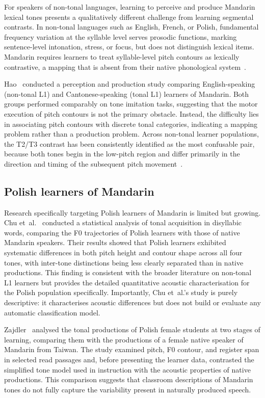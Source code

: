 For speakers of non-tonal languages, learning to perceive and produce Mandarin lexical tones presents a qualitatively different challenge from learning segmental contrasts. In non-tonal languages such as English, French, or Polish, fundamental frequency variation at the syllable level serves prosodic functions, marking sentence-level intonation, stress, or focus, but does not distinguish lexical items. Mandarin requires learners to treat syllable-level pitch contours as lexically contrastive, a mapping that is absent from their native phonological system~\cite{hao2012}.

Hao~\cite{hao2012} conducted a perception and production study comparing English-speaking (non-tonal L1) and Cantonese-speaking (tonal L1) learners of Mandarin. Both groups performed comparably on tone imitation tasks, suggesting that the motor execution of pitch contours is not the primary obstacle. Instead, the difficulty lies in associating pitch contours with discrete tonal categories, indicating a mapping problem rather than a production problem. Across non-tonal learner populations, the T2/T3 contrast has been consistently identified as the most confusable pair, because both tones begin in the low-pitch region and differ primarily in the direction and timing of the subsequent pitch movement~\cite{hao2012}.

\subsection{Polish learners of Mandarin}

Research specifically targeting Polish learners of Mandarin is limited but growing. Chu et~al.~\cite{chu2024statistical} conducted a statistical analysis of tonal acquisition in disyllabic words, comparing the F0 trajectories of Polish learners with those of native Mandarin speakers. Their results showed that Polish learners exhibited systematic differences in both pitch height and contour shape across all four tones, with inter-tone distinctions being less clearly separated than in native productions. This finding is consistent with the broader literature on non-tonal L1 learners but provides the detailed quantitative acoustic characterisation for the Polish population specifically. Importantly, Chu et~al.'s study is purely descriptive: it characterises acoustic differences but does not build or evaluate any automatic classification model.

Zajdler~\cite{zajdler2021} analysed the tonal productions of Polish female students at two stages of learning, comparing them with the productions of a female native speaker of Mandarin from Taiwan. The study examined pitch, F0 contour, and register span in selected read passages and, before presenting the learner data, contrasted the simplified tone model used in instruction with the acoustic properties of native productions. This comparison suggests that classroom descriptions of Mandarin tones do not fully capture the variability present in naturally produced speech.

